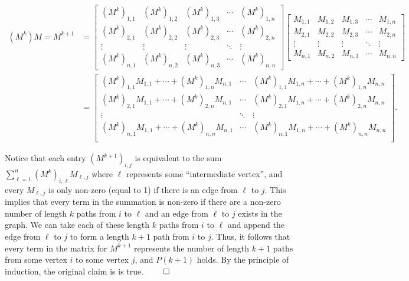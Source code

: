 \documentclass[11pt]{article}
\begin{document}
\tiny
\begin{align*}
    (M^k)M = M^{k+1}&= \begin{bmatrix}
        (M^k)_{1, 1} & (M^k)_{1, 2} & (M^k)_{1, 3} & \cdots & (M^k)_{1, n} \\
        (M^k)_{2, 1} & (M^k)_{2, 2} & (M^k)_{2, 3} & \cdots & (M^k)_{2, n} \\
        \vdots & \vdots & \vdots & \ddots & \vdots \\
        (M^k)_{n, 1} & (M^k)_{n, 2} & (M^k)_{n, 3} & \cdots & (M^k)_{n, n}
    \end{bmatrix}\begin{bmatrix}
        M_{1, 1} & M_{1, 2} & M_{1, 3} & \cdots & M_{1, n} \\
        M_{2, 1} & M_{2, 2} & M_{2, 3} & \cdots & M_{2, n} \\
        \vdots & \vdots & \vdots & \ddots & \vdots \\
        M_{n, 1} & M_{n, 2} & M_{n, 3} & \cdots & M_{n, n}
    \end{bmatrix} \\
    &= \begin{bmatrix}
        (M^k)_{1, 1} M_{1, 1} + \cdots + (M^k)_{1, n} M_{n, 1} & \cdots & (M^k)_{1, 1} M_{1, n} + \cdots + (M^k)_{1, n} M_{n, n} \\
        (M^k)_{2, 1} M_{1, 1} + \cdots + (M^k)_{2, n} M_{n, 1} & \cdots & (M^k)_{2, 1} M_{1, n} + \cdots + (M^k)_{2, n} M_{n, n} \\
        \vdots & \ddots & \vdots \\
        (M^k)_{n, 1} M_{1, 1} + \cdots + (M^k)_{n, n} M_{n, 1} & \cdots & (M^k)_{n, 1} M_{1, n} + \cdots + (M^k)_{n, n} M_{n, n} \\
    \end{bmatrix}.
\end{align*}

\normalsize
Notice that each entry $(M^{k+1})_{i, j}$ is equivalent to the sum $\sum_{\ell=1}^n (M^k)_{i, \ell}M_{\ell, j}$ where $\ell$ represents some ``intermediate vertex'', and every $M_{\ell, j}$ is only non-zero (equal to 1) if there is an edge from $\ell$ to $j$. This implies that every term in the summation is non-zero if there are a non-zero number of length $k$ paths from $i$ to $\ell$ and an edge from $\ell$ to $j$ exists in the graph. We can take each of these length $k$ paths from $i$ to $\ell$ and append the edge from $\ell$ to $j$ to form a length $k + 1$ path from $i$ to $j$. Thus, it follows that every term in the matrix for $M^{k+1}$ represents the number of length $k+1$ paths from some vertex $i$ to some vertex $j$, and $P(k+1)$ holds. By the principle of induction, the original claim is is true. \hfill $\qed$
\end{document}
